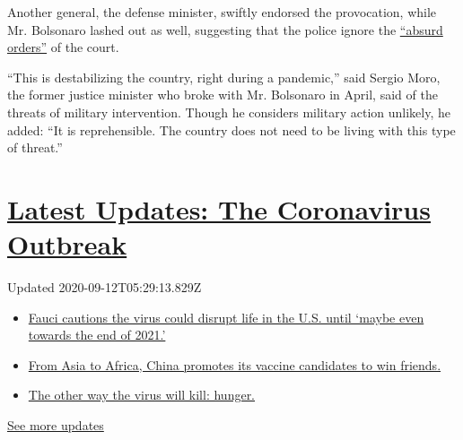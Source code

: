 Another general, the defense minister, swiftly endorsed the provocation,
while Mr. Bolsonaro lashed out as well, suggesting that the police
ignore the
\href{https://www.nytimes3xbfgragh.onion/2020/05/29/world/americas/brazil-bolsonaro-supreme-court.html}{``absurd
orders''} of the court.

``This is destabilizing the country, right during a pandemic,'' said
Sergio Moro, the former justice minister who broke with Mr. Bolsonaro in
April, said of the threats of military intervention. Though he considers
military action unlikely, he added: ``It is reprehensible. The country
does not need to be living with this type of threat.''

\hypertarget{latest-updates-the-coronavirus-outbreak}{%
\section{\texorpdfstring{\href{https://www.nytimes3xbfgragh.onion/2020/09/11/world/covid-19-coronavirus.html?action=click\&pgtype=Article\&state=default\&region=MAIN_CONTENT_1\&context=storylines_live_updates}{Latest
Updates: The Coronavirus
Outbreak}}{Latest Updates: The Coronavirus Outbreak}}\label{latest-updates-the-coronavirus-outbreak}}

Updated 2020-09-12T05:29:13.829Z

\begin{itemize}
\tightlist
\item
  \href{https://www.nytimes3xbfgragh.onion/2020/09/11/world/covid-19-coronavirus.html?action=click\&pgtype=Article\&state=default\&region=MAIN_CONTENT_1\&context=storylines_live_updates\#link-dfb8a16}{Fauci
  cautions the virus could disrupt life in the U.S. until `maybe even
  towards the end of 2021.'}
\item
  \href{https://www.nytimes3xbfgragh.onion/2020/09/11/world/covid-19-coronavirus.html?action=click\&pgtype=Article\&state=default\&region=MAIN_CONTENT_1\&context=storylines_live_updates\#link-7104d154}{From
  Asia to Africa, China promotes its vaccine candidates to win friends.}
\item
  \href{https://www.nytimes3xbfgragh.onion/2020/09/11/world/covid-19-coronavirus.html?action=click\&pgtype=Article\&state=default\&region=MAIN_CONTENT_1\&context=storylines_live_updates\#link-393ad215}{The
  other way the virus will kill: hunger.}
\end{itemize}

\href{https://www.nytimes3xbfgragh.onion/2020/09/11/world/covid-19-coronavirus.html?action=click\&pgtype=Article\&state=default\&region=MAIN_CONTENT_1\&context=storylines_live_updates}{See
more updates}

